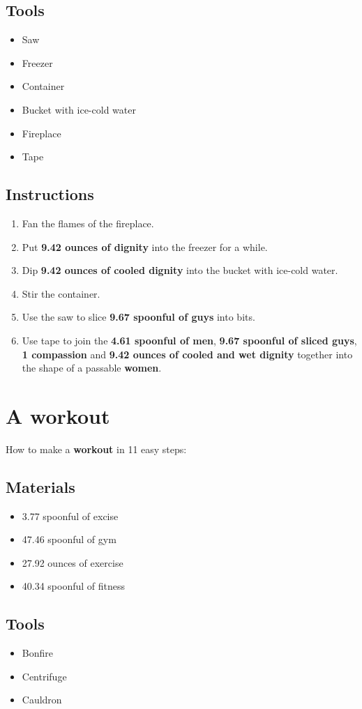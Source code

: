 \documentclass{article}
\begin{document}
\subsection{Tools}\begin{itemize}
\item 
Saw
\item 
Freezer
\item 
Container
\item 
Bucket with ice-cold water
\item 
Fireplace
\item 
Tape
\end{itemize}
\subsection{Instructions}\begin{enumerate}
\item 
Fan the flames of the fireplace.
\item 
Put \textbf{9.42 ounces of dignity} into the freezer for a while.
\item 
Dip \textbf{9.42 ounces of cooled dignity} into the bucket with ice-cold water.
\item 
Stir the container.
\item 
Use the saw to slice \textbf{9.67 spoonful of guys} into bits.
\item 
Use tape to join the \textbf{4.61 spoonful of men}, \textbf{9.67 spoonful of sliced guys}, \textbf{1 compassion} and \textbf{9.42 ounces of cooled and wet dignity} together into the shape of a passable \textbf{women}.
\end{enumerate}
\newpage
\section{A workout}How to make a \textbf{workout} in 11 easy steps:

\subsection{Materials}\begin{itemize}
\item 
3.77 spoonful of excise
\item 
47.46 spoonful of gym
\item 
27.92 ounces of exercise
\item 
40.34 spoonful of fitness
\end{itemize}
\subsection{Tools}\begin{itemize}
\item 
Bonfire
\item 
Centrifuge
\item 
Cauldron
\end{itemize}
\end{document}
